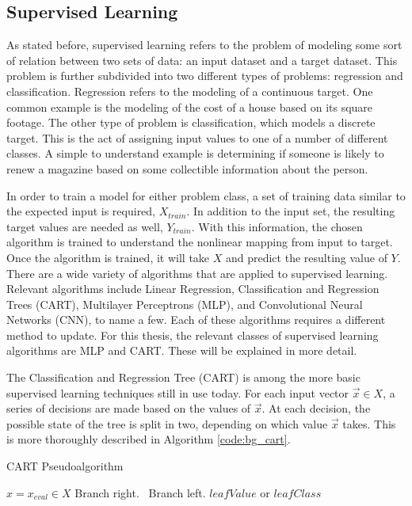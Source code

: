 \documentclass[11pt]{report}
\begin{document}
	\subsection{Supervised Learning}
	\par As stated before, supervised learning refers to the problem of modeling some sort of relation between two sets of data: an input dataset and a target dataset. This problem is further subdivided into two different types of problems: regression and classification. Regression refers to the modeling of a continuous target. One common example is the modeling of the cost of a house based on its square footage. The other type of problem is classification, which models a discrete target. This is the act of assigning input values to one of a number of different classes. A simple to understand example is determining if someone is likely to renew a magazine based on some collectible information about the person.  
	\par In order to train a model for either problem class, a set of training data similar to the expected input is required, $X_{train}$. In addition to the input set, the resulting target values are needed as well, $Y_{train}$. With this information, the chosen algorithm is trained to understand the nonlinear mapping from input to target. Once the algorithm is trained, it will take $X$ and predict the resulting value of $Y$. There are a wide variety of algorithms that are applied to supervised learning. Relevant algorithms include Linear Regression, Classification and Regression Trees (CART), Multilayer Perceptrons (MLP), and Convolutional Neural Networks (CNN), to name a few. Each of these algorithms requires a different method to update. For this thesis, the relevant classes of supervised learning algorithms are MLP and CART. These will be explained in more detail.
	\par The Classification and Regression Tree (CART) is among the more basic supervised learning techniques still in use today. For each input vector $\vec{x} \in X$, a series of decisions are made based on the values of $\vec{x}$. At each decision, the possible state of the tree is split in two, depending on which value $\vec{x}$ takes. This is more thoroughly described in Algorithm \ref{code:bg_cart}.
	\par 
	\begin{algorithm}[ht]
		\caption{CART Pseudoalgorithm}
		\label{code:bg_cart}
		\begin{algorithmic}[1]
			\State $x = x_{eval} \in X$
			 Branch right.
			\Else \ Branch left.
			\EndIf
			\EndWhile
			\State \Return $leafValue$ or $leafClass$
			\EndProcedure
		\end{algorithmic}
	\end{algorithm}
\end{document}
